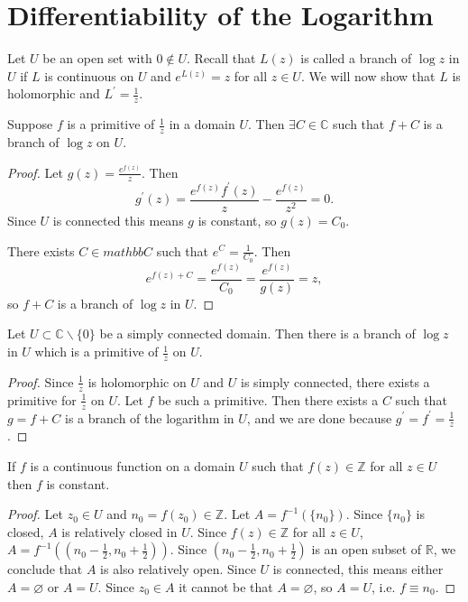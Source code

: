 \section{Differentiability of the Logarithm}

Let $U$ be an open set with $0 \notin U$.
Recall that $L(z)$ is called a branch of $\log z$ in $U$ if $L$
is continuous on $U$ and $e^{L(z)} = z$ for all $z \in U$. We will now
show that $L$ is holomorphic and $L^\prime = \frac{1}{z}$.

\begin{theorem}
Suppose $f$ is a primitive of $\frac{1}{z}$ in a domain $U$. Then
$\exists C \in \mathbb{C}$ such that $f + C$ is a branch of $\log z$ on $U$.
\end{theorem}

\begin{proof}
Let $g(z) = \frac{e^{f(z)}}{z}$. Then
$$
  g^\prime(z)
= \frac{e^{f(z)}f^\prime(z)}{z} - \frac{e^{f(z)}}{z^2}
= 0.
$$
Since $U$ is connected this means $g$ is constant, so
$g(z) = C_0$.

There exists $C \in mathbb{C}$ such that $e^C = \frac{1}{C_0}$. Then
$$
e^{f(z) + C} = \frac{e^{f(z)}}{C_0} = \frac{e^{f(z)}}{g(z)} = z,
$$
so $f + C$ is a branch of $\log z$ in $U$.
\end{proof}

\begin{theorem}
Let $U \subset \mathbb{C} \backslash \{ 0 \}$ be a
simply connected domain. Then there is a branch of $\log z$ in $U$
which is a primitive of $\frac{1}{z}$ on $U$.
\end{theorem}

\begin{proof}
Since $\frac{1}{z}$ is holomorphic on $U$ and $U$ is simply connected,
there exists a primitive for $\frac{1}{z}$ on $U$. Let $f$ be such a
primitive. Then there exists a $C$ such that $g = f + C$ is a branch of
the logarithm in $U$, and we are done because $g^\prime = f^\prime = \frac{1}{z}$.
\end{proof}

\begin{lemma}
If $f$ is a continuous function on a domain $U$ such that
$f(z) \in \mathbb{Z}$ for all $z \in U$ then $f$ is constant.
\end{lemma}

\begin{proof}
Let $z_0 \in U$ and $n_0 = f(z_0) \in \mathbb{Z}$. Let
$A = f^{-1}(\{n_0\})$. Since $\{n_0\}$ is closed, $A$ is
relatively closed in $U$. Since $f(z) \in \mathbb{Z}$ for all
$z \in U$, $A = f^{-1}((n_0 - \frac{1}{2}, n_0 + \frac{1}{2}))$.
Since $(n_0 - \frac{1}{2}, n_0 + \frac{1}{2})$ is an open subset
of $\mathbb{R}$, we conclude that $A$ is also relatively open.
Since $U$ is connected, this means either $A = \varnothing$ or
$A = U$. Since $z_0 \in A$ it cannot be that $A = \varnothing$,
so $A = U$, i.e. $f \equiv n_0$.
\end{proof}

